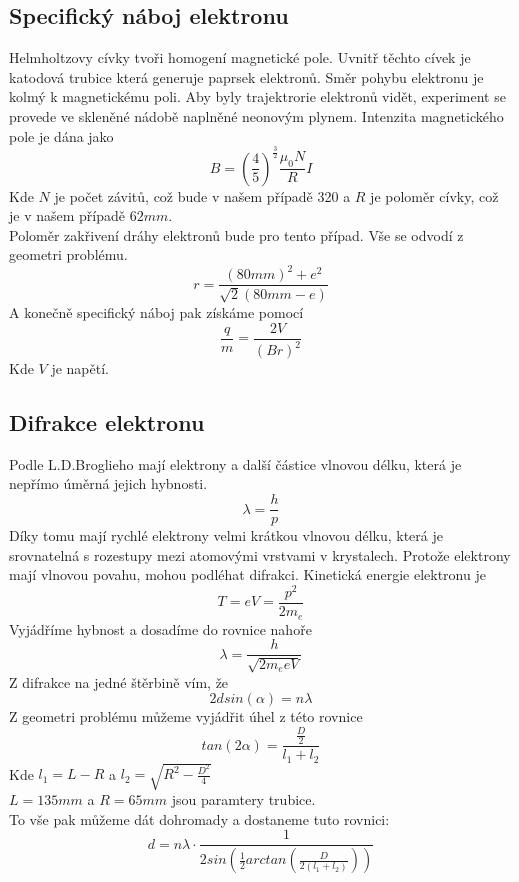 \documentclass{article}
\begin{document}
\subsection{Specifický náboj elektronu}
Helmholtzovy cívky tvoři homogení magnetické pole.
Uvnitř těchto cívek je katodová trubice která generuje paprsek elektronů.
Směr pohybu elektronu je kolmý k magnetickému poli.
Aby byly trajektrorie elektronů vidět, experiment se provede
ve skleněné nádobě naplněné neonovým plynem.
Intenzita magnetického pole je dána jako
\begin{equation}\label{eq:B}
  B = \left( \frac{4}{5} \right)^{\frac{3}{2}} \frac{\mu_{0}N}{R} I
\end{equation}
Kde $N$ je počet závitů, což bude v našem případě 320 a $R$ je poloměr cívky, což je v našem případě
$62 mm$.\\
Poloměr zakřivení dráhy elektronů bude pro tento případ. Vše se odvodí z geometri problému.
\begin{equation}\label{eq:r}
  r = \frac{(80mm)^{2} + e^{2}}{\sqrt{2} (80mm - e)}
\end{equation}
A konečně specifický náboj pak získáme pomocí
\begin{equation}\label{eq:qm}
  \frac{q}{m} = \frac{2V}{(Br)^{2}}
\end{equation}
Kde $V$ je napětí.
\subsection{Difrakce elektronu}
Podle L.D.Broglieho mají elektrony a další částice vlnovou délku, která je nepřímo úměrná jejich
hybnosti.
\begin{equation}\label{eq:deb}
  \lambda = \frac{h}{p}
\end{equation}
Díky tomu mají rychlé elektrony velmi krátkou vlnovou délku, která je srovnatelná s rozestupy mezi atomovými vrstvami v krystalech. Protože elektrony mají vlnovou povahu, mohou podléhat difrakci.
Kinetická energie elektronu je
\begin{equation}\label{eq:kin}
  T = eV = \frac{p^{2}}{2m_{e}}
\end{equation}
Vyjádříme hybnost a dosadíme do rovnice nahoře
\begin{equation}\label{eq:lam}
  \lambda = \frac{h}{\sqrt{2m_{e}eV}}
\end{equation}
Z difrakce na jedné štěrbině vím, že
\begin{equation}\label{eq:dif}
  2dsin(\alpha) = n \lambda
\end{equation}
Z geometri problému můžeme vyjádřit úhel z této rovnice
\begin{equation}\label{eq:tan}
  tan(2 \alpha) = \frac{\frac{D}{2}}{l_{1} + l_{2}}
\end{equation}
Kde $l_{1} = L - R$ a $l_{2} = \sqrt{R^{2} - \frac{D^{2}}{4}}$\\
$L = 135mm$ a $R = 65mm$ jsou paramtery trubice.\\
To vše pak můžeme dát dohromady a dostaneme tuto rovnici:
\begin{equation}\label{eq:final}
  d = n \lambda \cdot \frac{1}{2sin \left(\frac{1}{2} arctan \left( \frac{D}{2(l_{1} + l_{2})} \right)  \right)}
\end{equation}
\end{document}
